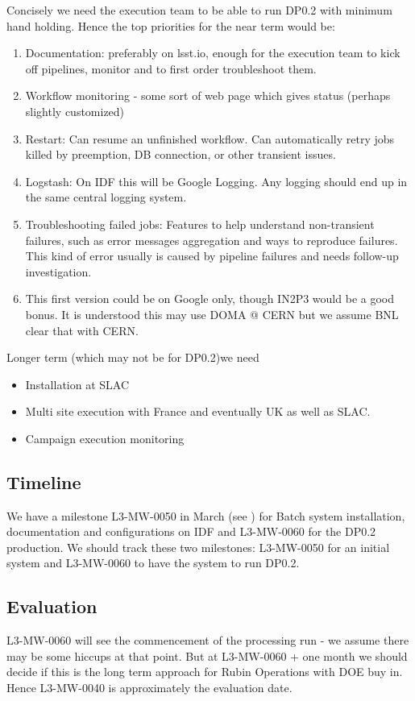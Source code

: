 Concisely we need the execution team to be able to run DP0.2 with minimum hand holding.
Hence the top priorities for the near term would be:
\begin{enumerate}
\item Documentation: preferably on lsst.io, enough for the execution team to kick off pipelines,  monitor and to first order troubleshoot them.
\item Workflow monitoring - some sort of web page which gives status (perhaps slightly customized)
\item Restart: Can resume an unfinished workflow. Can automatically retry jobs killed by preemption, DB connection, or other transient issues.
\item Logstash: On IDF this will be Google Logging. Any logging should end up in the same central logging system.
\item Troubleshooting failed jobs: Features to help understand non-transient failures, such as error messages aggregation and ways to reproduce failures. This kind of error usually is caused by pipeline failures and needs follow-up investigation.
\item This first version could be on Google only, though IN2P3 would be a good bonus.  It is understood this may use DOMA @ CERN but we assume BNL clear that with CERN.
\end{enumerate}
Longer term (which may not be for DP0.2)we need
\begin{itemize}
\item Installation at SLAC
\item Multi site execution with France and eventually UK as well as SLAC.
\item Campaign execution monitoring
\end{itemize}

\subsection{Timeline}
We have a milestone L3-MW-0050 in March (see ) for Batch system installation, documentation and configurations on IDF and L3-MW-0060 for the DP0.2 production.
We should track these two milestones: L3-MW-0050 for an initial system and L3-MW-0060 to
have the system to run DP0.2.

\subsection{Evaluation}
L3-MW-0060 will see the commencement of the processing run - we assume there may be some
hiccups  at that point. But at L3-MW-0060 + one month we should decide if this is the long term approach for Rubin Operations with DOE buy in.
Hence L3-MW-0040 is approximately the evaluation date.

